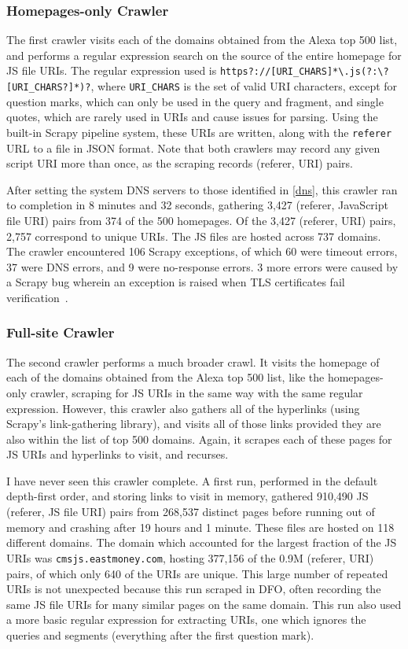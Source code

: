 \subsubsection*{Homepages-only Crawler}\label{homepages-crawler}
The first crawler visits each of the domains obtained from the Alexa top 500 list, and performs a regular expression search on the source of the entire homepage for JS file URIs.
The regular expression used is \texttt{https?://[URI\_CHARS]*\textbackslash{}.js\allowbreak{}(?:\textbackslash{}?[URI\_CHARS?]*)?}, where \texttt{URI\_CHARS} is the set of valid URI characters, except for question marks, which can only be used in the query and fragment, and single quotes, which are rarely used in URIs and cause issues for parsing.
Using the built-in Scrapy pipeline system, these URIs are written, along with the \texttt{referer} URL to a file in JSON format.
Note that both crawlers may record any given script URI more than once, as the scraping records (referer, URI) pairs.

After setting the system DNS servers to those identified in \autoref{dns}, this crawler ran to completion in 8 minutes and 32 seconds, gathering 3,427 (referer, JavaScript file URI) pairs from 374 of the 500 homepages.
Of the 3,427 (referer, URI) pairs, 2,757 correspond to unique URIs.
The JS files are hosted across 737 domains.
The crawler encountered 106 Scrapy exceptions, of which 60 were timeout errors, 37 were DNS errors, and 9 were no-response errors.
3 more errors were caused by a Scrapy bug wherein an exception is raised when TLS certificates fail verification~\cite{Calderone2015}.
\subsubsection*{Full-site Crawler}\label{full-crawler}
The second crawler performs a much broader crawl.
It visits the homepage of each of the domains obtained from the Alexa top 500 list, like the homepages-only crawler, scraping for JS URIs in the same way with the same regular expression.
However, this crawler also gathers all of the hyperlinks (using Scrapy's link-gathering library), and visits all of those links provided they are also within the list of top 500 domains.
Again, it scrapes each of these pages for JS URIs and hyperlinks to visit, and recurses.

I have never seen this crawler complete.
A first run, performed in the default depth-first order, and storing links to visit in memory, gathered 910,490 JS (referer, JS file URI) pairs from 268,537 distinct pages before running out of memory and crashing after 19 hours and 1 minute.
These files are hosted on 118 different domains.
The domain which accounted for the largest fraction of the JS URIs was \texttt{cmsjs.eastmoney.com}, hosting 377,156 of the 0.9M (referer, URI) pairs, of which only 640 of the URIs are unique.
This large number of repeated URIs is not unexpected because this run scraped in DFO, often recording the same JS file URIs for many similar pages on the same domain.
This run also used a more basic regular expression for extracting URIs, one which ignores the queries and segments (everything after the first question mark).

